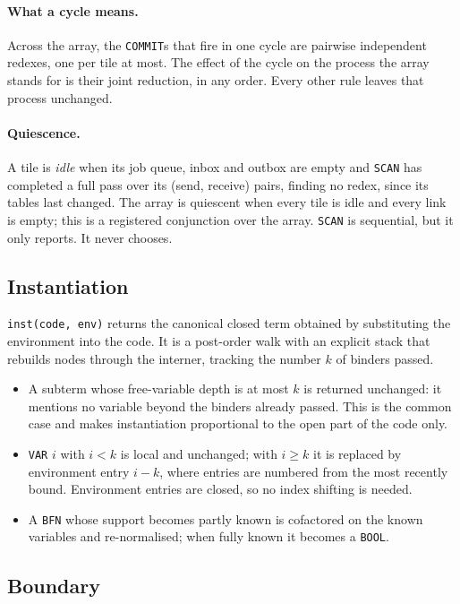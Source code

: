 \documentclass[11pt]{article}
\newcommand{\kw}[1]{\texttt{#1}}
\theoremstyle{definition}
\theoremstyle{remark}
\begin{document}
\paragraph{What a cycle means.} Across the array, the \kw{COMMIT}s that fire
in one cycle are pairwise independent redexes, one per tile at most. The
effect of the cycle on the process the array stands for is their joint
reduction, in any order. Every other rule leaves that process unchanged.

\paragraph{Quiescence.} A tile is \emph{idle} when its job queue, inbox and
outbox are empty and \kw{SCAN} has completed a full pass over its (send,
receive) pairs, finding no redex, since its tables last changed. The array is
quiescent when every tile is idle and every link is empty; this is a
registered conjunction over the array. \kw{SCAN} is sequential, but it only
reports. It never chooses.

\subsection{Instantiation}\label{sec:inst}

\kw{inst(code, env)} returns the canonical closed term obtained by
substituting the environment into the code. It is a post-order walk with an
explicit stack that rebuilds nodes through the interner, tracking the number
$k$ of binders passed.
\begin{itemize}
\item A subterm whose free-variable depth is at most $k$ is returned
unchanged: it mentions no variable beyond the binders already passed. This is
the common case and makes instantiation proportional to the open part of the
code only.
\item \kw{VAR} $i$ with $i<k$ is local and unchanged; with $i \ge k$ it is
replaced by environment entry $i-k$, where entries are numbered from the most
recently bound. Environment entries are closed, so no index shifting is needed.
\item A \kw{BFN} whose support becomes partly known is cofactored on the
known variables and re-normalised; when fully known it becomes a \kw{BOOL}.
\end{itemize}

\subsection{Boundary}\label{sec:boundary}
\end{document}
